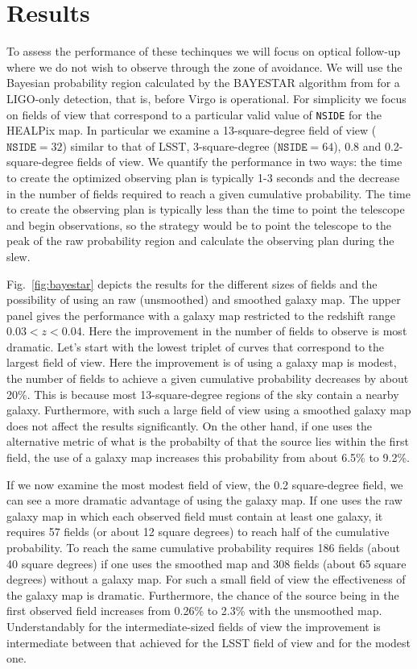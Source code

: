 \documentclass[useAMS,usenatbib]{mn2e}
\begin{document}
\section{Results}

To assess the performance of these techinques we will focus on optical
follow-up where we do not wish to observe through the zone of
avoidance.  We will use the Bayesian probability region calculated by
the BAYESTAR algorithm \citep{2015arXiv150803634S} from
\citet{2014ApJ...795..105S} for a LIGO-only detection, that is, before
Virgo is operational.  For simplicity we focus on fields of view that
correspond to a particular valid value of \texttt{NSIDE} for the
HEALPix map.  In particular we examine a 13-square-degree field of
view ($\mathtt{NSIDE}=32$) similar to that of LSST, 3-square-degree
($\mathtt{NSIDE}=64$), 0.8 and 0.2-square-degree fields of view.  We
quantify the performance in two ways: the time to create the optimized
observing plan is typically 1-3 seconds and the decrease in the number
of fields required to reach a given cumulative probability.  The time
to create the observing plan is typically less than the time to point
the telescope and begin observations, so the strategy would be to
point the telescope to the peak of the raw probability region and
calculate the observing plan during the slew.

Fig.~\ref{fig:bayestar} depicts the results for the different sizes of
fields and the possibility of using an raw (unsmoothed) and smoothed
galaxy map.  The upper panel gives the performance with a galaxy map
restricted to the redshift range $0.03<z<0.04$.  Here the improvement
in the number of fields to observe is most dramatic.  Let's start with
the lowest triplet of curves that correspond to the largest field of
view.  Here the improvement is of using a galaxy map is modest, the
number of fields to achieve a given cumulative probability decreases
by about 20\%.  This is because most 13-square-degree regions of the
sky contain a nearby galaxy. Furthermore, with such a large field of
view using a smoothed galaxy map does not affect the results
significantly.  On the other hand, if one uses the alternative metric
of what is the probabilty of that the source lies within the first
field, the use of a galaxy map increases this probability from about
6.5\% to 9.2\%.

If we now examine the most modest field of view, the 0.2 square-degree
field, we can see a more dramatic advantage of using the galaxy map.
If one uses the raw galaxy map in which each observed field must
contain at least one galaxy, it requires 57 fields (or about 12 square
degrees) to reach half of the cumulative probability.  To reach the
same cumulative probability requires 186 fields (about 40 square
degrees) if one uses the smoothed map and 308 fields (about 65 square
degrees) without a galaxy map.  For such a small field of view the
effectiveness of the galaxy map is dramatic.  Furthermore, the chance
of the source being in the first observed field increases from 0.26\%
to 2.3\% with the unsmoothed map.  Understandably for the
intermediate-sized fields of view the improvement is intermediate
between that achieved for the LSST field of view and for the modest one.
\end{document}
